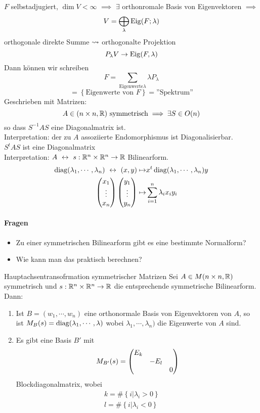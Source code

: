 \begin{Bem}
  $F$ selbstadjugiert, $\dim V <\infty$ $\implies$ $\exists$ orthonromale Basis von Eigenvektoren $\implies$
  \[V=\bigoplus_\lambda \operatorname{Eig}(F;\lambda)\]
  orthogonale direkte Summe $\rightsquigarrow$ orthogonalte Projektion \[P_\lambda V\to \operatorname{Eig} (F,\lambda)\] Dann können wir schreiben
  \[F=\sum_{\text{Eigenwerte} \lambda} \lambda P_\lambda\]
  \[=\left\{ \text{Eigenwerte von } F \right\}=\text{''Spektrum''}\]
  Geschrieben mit Matrizen:
  \[A\in (n\times n, \mathbb{R}) \text{ symmetrisch} \implies \exists S\in O(n)\]
  so dass $S^{-1}AS$ eine Diagonalmatrix ist.\\
  Interpretation: der zu $A$ assoziierte Endomorphismus ist Diagonalisierbar.\\
  $S^tAS$ ist eine Diagonalmatrix\\
  Interpretation: $A\ \lra\ s:\mb{R}^n\times\mb{R}^n\to\mb{R}$ Bilinearform. 
  \begin{align*}
    \operatorname{diag}(\lambda_1,\cdots,\lambda_n)\ \leftrightarrow\ (x,y)\mapsto& x^t\operatorname{diag}(\lambda_1,\cdots,\lambda_n)y\\
    \begin{pmatrix}x_1\\\vdots\\x_n\end{pmatrix}\begin{pmatrix}y_1\\\vdots\\y_n\end{pmatrix}\mapsto&\sum_{i=1}^n\lambda_ix_iy_i
  \end{align*}
  \paragraph{Fragen}
  \begin{itemize}
    \item Zu einer symmetrischen Bilinearform gibt es eine bestimmte Normalform?
    \item Wie kann man das praktisch berechnen?
  \end{itemize}
\end{Bem}
\begin{Prop}{Hauptachsentransofrmation symmetrischer Matrizen}
  Sei $A\in M(n\times n,\mathbb{R})$ symmetrisch und $s:\mathbb{R}^n\times\mathbb{R}^n\to\mathbb{R}$ die entsprechende symmetrische Bilinearform. Dann:
  \begin{enumerate}
    \item Ist $B=(w_1,\cdots,w_n)$ eine orthonormale Basis von Eigenvektoren von $A$, so ist $M_B(s)=\operatorname{diag}(\lambda_1,\cdots,\lambda)$ wobei $\lambda_1,\cdots,\lambda_n)$ die Eigenwerte von $A$ sind.
    \item Es gibt eine Basis $B'$ mit
      \[M_{B'}(s)=\begin{pmatrix}E_k & &\\ & -E_l&\\& & 0\end{pmatrix}\]
      Blockdiagonalmatrix, wobei
      \begin{align*}
        k=\#\left\{ i|\lambda_i>0 \right\}&&\\
        l=\#\left\{ i|\lambda_i<0 \right\}&&
      \end{align*}
  \end{enumerate}
\end{Prop}
